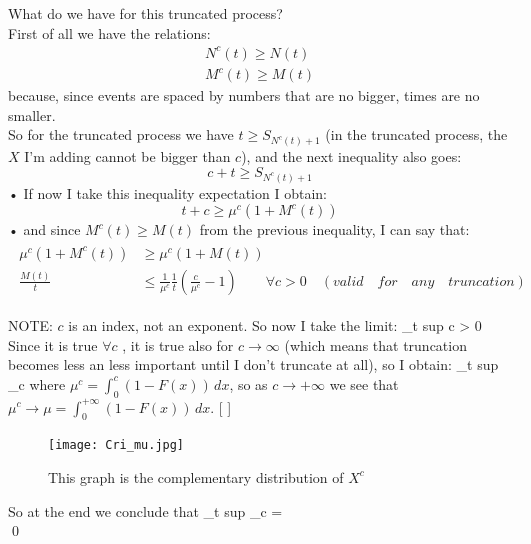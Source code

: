 	What do we have for this truncated process?\\
	First of all we have the relations:
	\begin{equation}
	\begin{split}
	N^c(t) \geq N(t)\\
	M^c(t) \geq M(t)
	\end{split}
	\end{equation}
	because, since events are spaced by numbers that are no bigger, times are no smaller.\\

	So for the truncated process we have $t \geq S_{N^c(t) +1}$ (in the truncated process, the $X$ I'm adding cannot be bigger than $c$), and the next inequality also goes:
	\begin{equation}
	c+t \geq S_{N^c(t)+1}
	\end{equation}•
	If now I take this inequality expectation I obtain:
	\begin{equation}
	t+c \geq \mu^c(1+M^c(t))
	\end{equation}•
	and since $M^c(t) \geq M(t)$ from the previous inequality, I can say that:
	\begin{align}
	\begin{split}
	\mu^c(1+M^c(t)) &\geq \mu^c(1+M(t))\\
	\frac{M(t)}{t} &\leq \frac{1}{\mu^c} \frac{1}{t}(\frac{c}{\mu^c}-1) \qquad \forall c > 0 \quad (valid\quad for\quad any\quad truncation)
	\end{split}
	\end{align}

	NOTE: $c$ is an index, not an exponent.
	So now I take the limit:
	\beq
	\lim_{t \to \infty} sup  \leq {} \qquad \forall c > 0
	\eeq
	Since it is true $\forall c$ , it is true also for $c \to \infty$ (which means that truncation becomes less an less important until I don't truncate at all), so I obtain:
	\beq
	\lim_{t \to \infty} sup  \leq \lim_{c \to \infty} 
	\eeq
	where $\mu^c = \int_0^c(1-F(x))\,dx$, so as $c \to +\infty$ we see that $\mu^c \to \mu = \int_0^{+\infty}(1-F(x))\,dx$. [ ]
	\begin{figure}
	\centering
	\texttt{[image: Cri\_mu.jpg]}
	\caption{This graph is the complementary distribution of $X^c$}
	\label{fig:mu}
	\end{figure}

	So at the end we conclude that
	\beq
	\lim_{t \to \infty} sup  \leq \lim_{c \to \infty}  = 
	\eeq
	\\
	\qed
